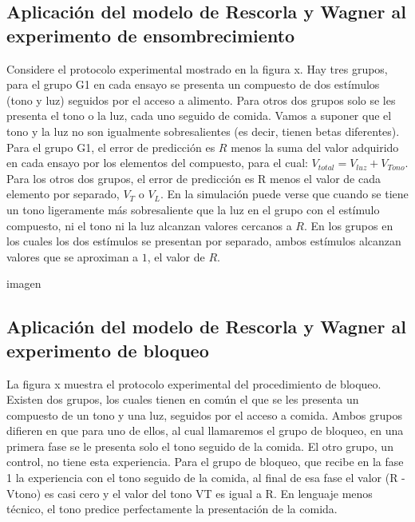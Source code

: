 \documentclass[
  letterpaper,
]{book}
\begin{document}
\subsection{Aplicación del modelo de Rescorla y Wagner al experimento de
ensombrecimiento}\label{aplicaciuxf3n-del-modelo-de-rescorla-y-wagner-al-experimento-de-ensombrecimiento}

Considere el protocolo experimental mostrado en la figura x. Hay tres
grupos, para el grupo G1 en cada ensayo se presenta un compuesto de dos
estímulos (tono y luz) seguidos por el acceso a alimento. Para otros dos
grupos solo se les presenta el tono o la luz, cada uno seguido de
comida. Vamos a suponer que el tono y la luz no son igualmente
sobresalientes (es decir, tienen betas diferentes). Para el grupo G1, el
error de predicción es \(R\) menos la suma del valor adquirido en cada
ensayo por los elementos del compuesto, para el cual:
\(V_{total} =  V_{luz} + V_{Tono}\). Para los otros dos grupos, el error
de predicción es R menos el valor de cada elemento por separado, \(V_T\)
o \(V_L\). En la simulación puede verse que cuando se tiene un tono
ligeramente más sobresaliente que la luz en el grupo con el estímulo
compuesto, ni el tono ni la luz alcanzan valores cercanos a \(R\). En
los grupos en los cuales los dos estímulos se presentan por separado,
ambos estímulos alcanzan valores que se aproximan a \(1\), el valor de
\(R\).

imagen

\subsection{Aplicación del modelo de Rescorla y Wagner al experimento de
bloqueo}\label{aplicaciuxf3n-del-modelo-de-rescorla-y-wagner-al-experimento-de-bloqueo}

La figura x muestra el protocolo experimental del procedimiento de
bloqueo. Existen dos grupos, los cuales tienen en común el que se les
presenta un compuesto de un tono y una luz, seguidos por el acceso a
comida. Ambos grupos difieren en que para uno de ellos, al cual
llamaremos el grupo de bloqueo, en una primera fase se le presenta solo
el tono seguido de la comida. El otro grupo, un control, no tiene esta
experiencia. Para el grupo de bloqueo, que recibe en la fase 1 la
experiencia con el tono seguido de la comida, al final de esa fase el
valor (R - Vtono) es casi cero y el valor del tono VT es igual a R. En
lenguaje menos técnico, el tono predice perfectamente la presentación de
la comida.
\end{document}
